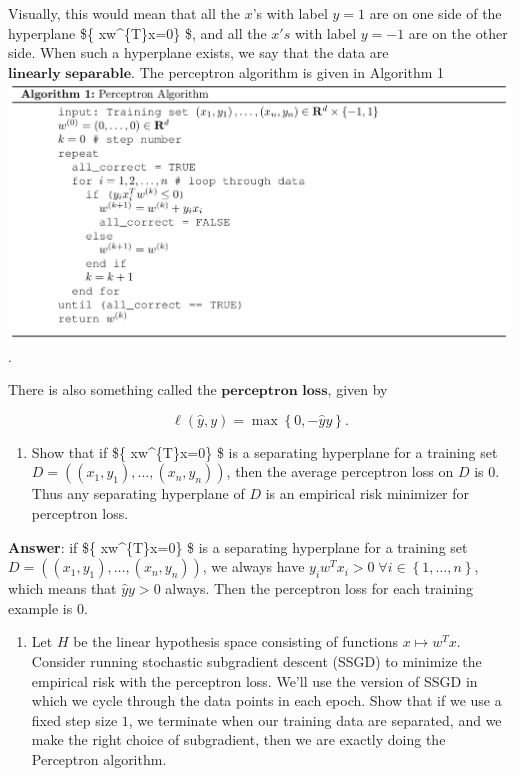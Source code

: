 \documentclass[11pt]{article}
\makeatletter
\def\maxwidth{\ifdim\Gin@nat@width>\linewidth\linewidth
    \else\Gin@nat@width\fi}
\let\Oldincludegraphics\includegraphics
\renewcommand{\includegraphics}[1]{\Oldincludegraphics[width=.8\maxwidth]{#1}}
\providecommand{\tightlist}{%
      \setlength{\itemsep}{0pt}\setlength{\parskip}{0pt}}
\makeatother
\begin{document}
Visually, this would mean that all the \(x\)'s with label \(y=1\) are on
one side of the hyperplane \$\left\{ x\mid w\^{}\{T\}x=0\right\} \$, and
all the \(x's\) with label \(y=-1\) are on the other side. When such a
hyperplane exists, we say that the data are
\(\textbf{linearly separable}\). The perceptron algorithm is given in
Algorithm 1 \includegraphics{perceptron.png}.

There is also something called the \(\textbf{perceptron loss,}\) given
by

\[
\ell(\hat{y},y)=\max\left\{ 0,-\hat{y}y\right\} .
\]

    \begin{enumerate}
\def\labelenumi{\arabic{enumi}.}
\tightlist
\item
  Show that if \$\left\{ x\mid w\^{}\{T\}x=0\right\} \$ is a separating
  hyperplane for a training set
  \(D=\left(\left(x_{1},y_{1}\right),\ldots,(x_{n},y_{n})\right)\), then
  the average perceptron loss on \(D\) is \(0\). Thus any separating
  hyperplane of \(D\) is an empirical risk minimizer for perceptron
  loss.
\end{enumerate}

    \textbf{Answer}: if \$\left\{ x\mid w\^{}\{T\}x=0\right\} \$ is a
separating hyperplane for a training set
\(D=\left(\left(x_{1},y_{1}\right),\ldots,(x_{n},y_{n})\right)\), we
always have
\(y_{i}w^{T}x_{i}>0\;\forall i\in\left\{ 1,\ldots,n\right\}\), which
means that \(\hat{y}y > 0\) always. Then the perceptron loss for each
training example is \(0\).

    \begin{enumerate}
\def\labelenumi{\arabic{enumi}.}
\setcounter{enumi}{1}
\tightlist
\item
  Let \(H\) be the linear hypothesis space consisting of functions
  \(x\mapsto w^{T}x\). Consider running stochastic subgradient descent
  (SSGD) to minimize the empirical risk with the perceptron loss. We'll
  use the version of SSGD in which we cycle through the data points in
  each epoch. Show that if we use a fixed step size \(1\), we terminate
  when our training data are separated, and we make the right choice of
  subgradient, then we are exactly doing the Perceptron algorithm.
\end{enumerate}
\end{document}
